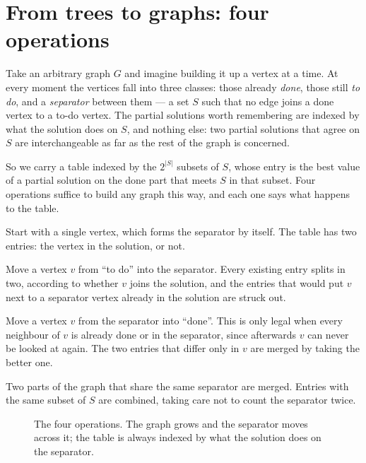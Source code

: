 \section{From trees to graphs: four operations}
\label{sec:tw-four-operations}

Take an arbitrary graph $G$ and imagine building it up a vertex at a time. At
every moment the vertices fall into three classes: those already \emph{done},
those still \emph{to do}, and a \emph{separator} between them --- a set $S$ such
that no edge joins a done vertex to a to-do vertex. The partial solutions worth
remembering are indexed by what the solution does on $S$, and nothing else:
two partial solutions that agree on $S$ are interchangeable as far as the rest
of the graph is concerned.

So we carry a table indexed by the $2^{|S|}$ subsets of $S$, whose entry is the
best value of a partial solution on the done part that meets $S$ in that
subset. Four operations suffice to build any graph this way, and each one says
what happens to the table.

\begin{description}[leftmargin=1.2em,style=nextline]
  \item[New graph (leaf).] Start with a single vertex, which forms the
        separator by itself. The table has two entries: the vertex in the
        solution, or not.
  \item[Introduce a vertex.] Move a vertex $v$ from ``to do'' into the
        separator. Every existing entry splits in two, according to whether $v$
        joins the solution, and the entries that would put $v$ next to a
        separator vertex already in the solution are struck out.
  \item[Forget a vertex.] Move a vertex $v$ from the separator into ``done''.
        This is only legal when every neighbour of $v$ is already done or in the
        separator, since afterwards $v$ can never be looked at again. The two
        entries that differ only in $v$ are merged by taking the better one.
  \item[Join.] Two parts of the graph that share the same separator are merged.
        Entries with the same subset of $S$ are combined, taking care not to
        count the separator twice.
\end{description}

\begin{figure}[ht]
\centering
{}
\caption{The four operations. The graph grows and the separator moves across it;
the table is always indexed by what the solution does on the separator.}
\label{fig:tw-four-operations}
\end{figure}

